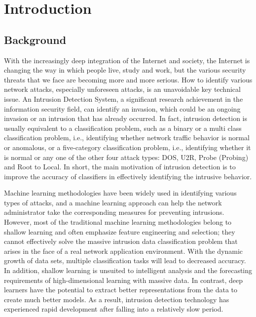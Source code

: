 \newpage
{} %

\chapter{Introduction}
\vspace{-18pt}
\section{Background}\label{sec:bkgrnd}%
\vspace{-18pt}
With the increasingly deep integration of the Internet and society, the Internet is changing the way in which people live, study and work, but the various security threats that we face are becoming more and more serious. How to identify various network attacks, especially unforeseen attacks, is an unavoidable key technical issue. An Intrusion Detection System, a significant research achievement in the information security field, can identify an invasion, which could be an ongoing invasion or an intrusion that has already occurred. In fact, intrusion detection is usually equivalent to a classification problem, such as a binary or a multi class classification problem, i.e., identifying whether network traffic behavior is normal or anomalous, or a five-category classification problem, i.e., identifying whether it is normal or any one of the other four attack types: DOS, U2R, Probe (Probing) and Root to Local. In short, the main motivation of intrusion detection is to improve the accuracy of classifiers in effectively identifying the intrusive behavior.\par
Machine learning methodologies have been widely used in identifying various types of attacks, and a machine learning approach can help the network administrator take the corresponding measures for preventing intrusions. However, most of the traditional machine learning methodologies belong to shallow learning and often emphasize feature engineering and selection; they cannot effectively solve the massive intrusion data classification problem that arises in the face of a real network application environment. With the dynamic growth of data sets, multiple classification tasks will lead to decreased accuracy. In addition, shallow learning is unsuited to intelligent analysis and the forecasting requirements of high-dimensional learning with massive data. In contrast, deep learners have the potential to extract better representations from the data to create much better models. As a result, intrusion detection technology has experienced rapid development after falling into a relatively slow period\cite{yin2017deep}.%

